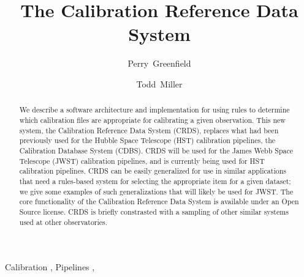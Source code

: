 \documentclass[final,authoryear,5p,times,twocolumn]{elsarticle}
\begin{document}
\begin{frontmatter}



\title{The Calibration Reference Data System}



\author[stsci]{Perry~Greenfield}
\author[stsci]{Todd~Miller}

\address[stsci]{Space Telescope Science Institute, 3700 San Martin Drive, Baltimore, MD 21218, USA}

\begin{abstract}

We describe a software architecture and implementation for using rules to
determine which calibration files are appropriate for calibrating a
given observation. This new system, the Calibration Reference Data System
(CRDS), replaces what had been previously used for
the Hubble Space Telescope (HST) calibration pipelines, 
the Calibration Database System (CDBS). 
CRDS will be used for the James Webb Space
Telescope (JWST) calibration pipelines, and is currently
being used for HST calibration pipelines. CRDS can be
easily generalized for use in similar applications that need a rules-based
system for selecting the appropriate item for a given dataset; we give some
examples of such generalizations that will likely be used for JWST. The core
functionality of the Calibration Reference Data System is available under an
Open Source license. CRDS is briefly constrasted with a 
sampling of other similar systems used at other observatories.
\end{abstract}

\begin{keyword}


Calibration \sep
Pipelines \sep

\end{keyword}

\end{frontmatter}
\end{document}
